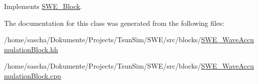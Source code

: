 Implements \hyperlink{classSWE__Block_ab2b4b659f23d5d45413dece8d2da3298}{S\-W\-E\-\_\-\-Block}.



The documentation for this class was generated from the following files\-:\begin{DoxyCompactItemize}
\item 
/home/sascha/\-Dokumente/\-Projects/\-Tsun\-Sim/\-S\-W\-E/src/blocks/\hyperlink{SWE__WaveAccumulationBlock_8hh}{S\-W\-E\-\_\-\-Wave\-Accumulation\-Block.\-hh}\item 
/home/sascha/\-Dokumente/\-Projects/\-Tsun\-Sim/\-S\-W\-E/src/blocks/\hyperlink{SWE__WaveAccumulationBlock_8cpp}{S\-W\-E\-\_\-\-Wave\-Accumulation\-Block.\-cpp}\end{DoxyCompactItemize}
